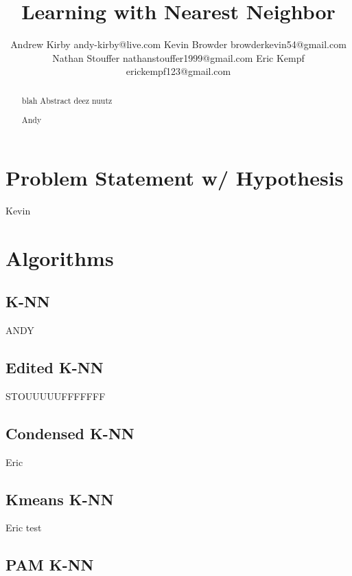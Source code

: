 \documentclass[twoside,11pt]{article}
\begin{document}
\title{Learning with Nearest Neighbor}

\author{\name Andrew Kirby \email andy-kirby@live.com \AND
		\name Kevin Browder \email browderkevin54@gmail.com \AND
		\name Nathan Stouffer \email nathanstouffer1999@gmail.com \AND
		\name Eric Kempf \email erickempf123@gmail.com }

\maketitle

\begin{abstract}
	blah Abstract deez nuutz
	
	Andy 
	
\end{abstract}

\section{Problem Statement w/ Hypothesis}

Kevin

\section{Algorithms}

\subsection{K-NN}

ANDY

\subsection{Edited K-NN}

STOUUUUUFFFFFFF

\subsection{Condensed K-NN}

Eric

\subsection{Kmeans K-NN}

Eric test

\subsection{PAM K-NN}
\end{document}

